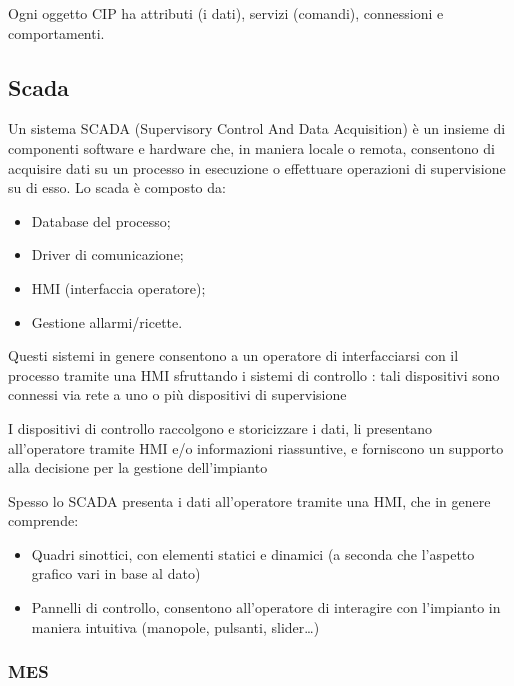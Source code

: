 \documentclass[
]{article}
\providecommand{\tightlist}{%
  \setlength{\itemsep}{0pt}\setlength{\parskip}{0pt}}
\begin{document}
{Ogni oggetto CIP ha attributi (i dati), servizi (comandi), connessioni
e comportamenti.}

{}

{}

\subsection{\texorpdfstring{{Scada}}{Scada}}\label{h.eiqpb9kkqron}

{Un sistema SCADA (Supervisory Control And Data Acquisition) è un
insieme di componenti software e hardware che, in maniera locale o
remota, consentono di acquisire dati su un processo in esecuzione o
effettuare operazioni di supervisione su di esso. Lo scada è composto
da:}

\begin{itemize}
\tightlist
\item
  {Database del processo;}
\item
  {Driver di comunicazione;}
\item
  {HMI (interfaccia operatore);}
\item
  {Gestione allarmi/ricette.}
\end{itemize}

{}

{Questi sistemi in genere consentono a un operatore di interfacciarsi
con il processo tramite una HMI sfruttando i sistemi di controllo : tali
dispositivi sono connessi via rete a uno o più dispositivi di
supervisione}

{}

{I dispositivi di controllo raccolgono e storicizzare i dati, li
presentano all'operatore tramite HMI e/o informazioni riassuntive, e
forniscono un supporto alla decisione per la gestione dell'impianto}

{}

{Spesso lo SCADA presenta i dati all'operatore tramite una HMI, che in
genere comprende: }

\begin{itemize}
\tightlist
\item
  {Quadri sinottici, con elementi statici e dinamici (a seconda che
  l'aspetto grafico vari in base al dato) }
\item
  {Pannelli di controllo, consentono all'operatore di interagire con
  l'impianto in maniera intuitiva (manopole, pulsanti, slider\ldots)}
\end{itemize}

\subsubsection{\texorpdfstring{{MES}}{MES}}\label{h.3pe14gvnscu7}
\end{document}
